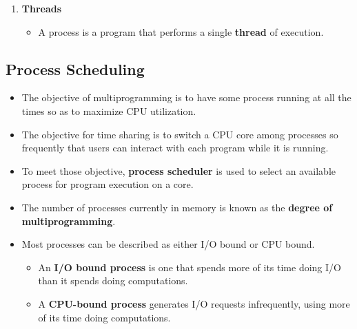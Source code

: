 \documentclass[10pt]{article}
\begin{document}
\begin{enumerate}
	\item \textbf{Threads}
	\begin{itemize}
		\item A process is a program that performs a single \textbf{thread} of execution.
	\end{itemize}
\end{enumerate}

\subsection{Process Scheduling}

\begin{itemize}
	\item The objective of multiprogramming is to have some process running at all the times so as to maximize CPU utilization.
	\item The objective for time sharing is to switch a CPU core among processes so frequently that users can interact with each program while it is running.
	\item To meet those objective, \textbf{process scheduler} is used to select an available process for program execution on a core.
	\item The number of processes currently in memory is known as the \textbf{degree of multiprogramming}.
	\item Most processes can be described as either I/O bound or CPU bound.
	\begin{itemize}
		\item An \textbf{I/O bound process} is one that spends more of its time doing I/O than it spends doing computations.
		\item A \textbf{CPU-bound process} generates I/O requests infrequently, using more of its time doing computations. 
	\end{itemize}
\end{itemize}
\end{document}
